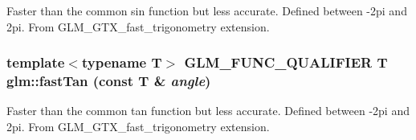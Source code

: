 Faster than the common sin function but less accurate. Defined between -2pi and 2pi. From GLM\_\-GTX\_\-fast\_\-trigonometry extension. \hypertarget{group__gtx__fast__trigonometry_gd182bf6a962a33e47d5f6daf06ca3d6b}{
\subsubsection[fastTan]{\setlength{\rightskip}{0pt plus 5cm}template$<$typename T$>$ GLM\_\-FUNC\_\-QUALIFIER T glm::fastTan (const T \& {\em angle})}}
\label{group__gtx__fast__trigonometry_gd182bf6a962a33e47d5f6daf06ca3d6b}


Faster than the common tan function but less accurate. Defined between -2pi and 2pi. From GLM\_\-GTX\_\-fast\_\-trigonometry extension. 